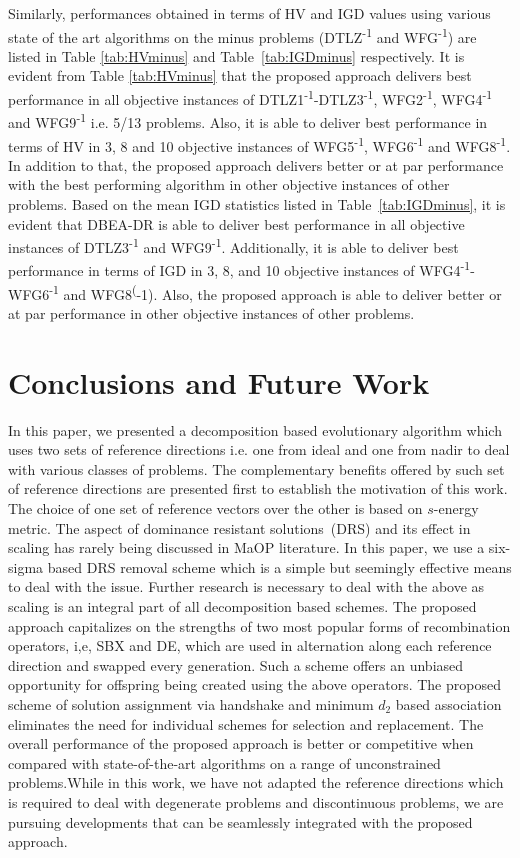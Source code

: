 \documentclass{sig-alternate}
\begin{document}
Similarly, performances obtained in terms of HV and IGD values using various state of the art algorithms on the minus problems (DTLZ\textsuperscript{-1} and WFG\textsuperscript{-1}) are listed in Table \ref{tab:HVminus} and Table~\ref{tab:IGDminus} respectively. It is evident from Table \ref{tab:HVminus} that the proposed approach delivers best performance in all objective instances of DTLZ1\textsuperscript{-1}-DTLZ3\textsuperscript{-1}, WFG2\textsuperscript{-1}, WFG4\textsuperscript{-1} and WFG9\textsuperscript{-1} i.e. 5/13 problems. Also, it is able to deliver best performance in terms of HV in 3, 8 and 10 objective instances of WFG5\textsuperscript{-1}, WFG6\textsuperscript{-1} and WFG8\textsuperscript{-1}. In addition to that, the proposed approach delivers better or at par performance with the best performing algorithm in other objective instances of other problems. Based on the mean IGD statistics listed in Table~\ref{tab:IGDminus}, it is evident that DBEA-DR is able to deliver best performance in all objective instances of DTLZ3\textsuperscript{-1} and WFG9\textsuperscript{-1}. Additionally, it is able to deliver best performance in terms of IGD in 3, 8, and 10 objective instances of WFG4\textsuperscript{-1}-WFG6\textsuperscript{-1} and WFG8\textsuperscript(-1). Also, the proposed approach is able to deliver better or at par performance in other objective instances of other problems.

\section{Conclusions and Future Work}
\label{sec:conc}
In this paper, we presented a decomposition based evolutionary algorithm which uses two sets of reference directions i.e. one from ideal and one from nadir to deal with various classes of problems. The complementary benefits offered by such set of reference directions are presented first to establish the motivation of this work. The choice of one set of reference vectors over the other is based on $s$-energy metric. The aspect of dominance resistant solutions~(DRS) and its effect in scaling has rarely being discussed in MaOP literature. In this paper, we use a six-sigma based DRS removal scheme which is a simple but seemingly effective means to deal with the issue. Further research is necessary to deal with the above as scaling is an integral part of all decomposition based schemes. 
The proposed approach capitalizes on the strengths of two most popular forms of recombination operators, i,e, SBX and DE, which are used in alternation along each reference direction and swapped every generation. Such a scheme offers an unbiased opportunity for offspring being created using the above operators. The proposed scheme of solution assignment via handshake and minimum $d_2$ based association eliminates the need for individual schemes for selection and replacement. The overall performance of the proposed approach is better or competitive when compared with state-of-the-art algorithms on a range of unconstrained problems.While in this work, we have not adapted the reference directions which is required to deal with degenerate problems and discontinuous problems, we are pursuing developments that can be seamlessly integrated with the proposed approach.
\end{document}
